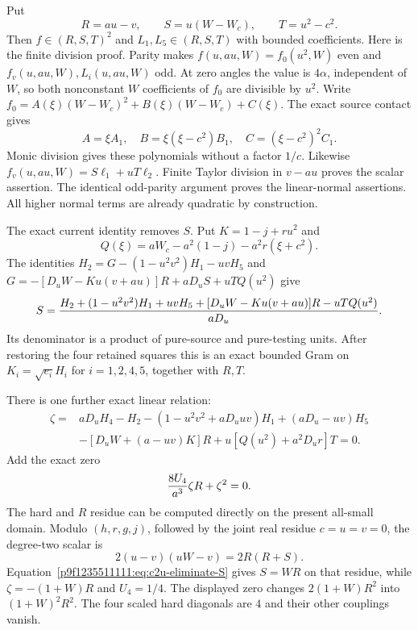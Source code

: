 Put
\[
 R=au-v,\qquad S=u(W-W_c),\qquad T=u^2-c^2.
\]
Then $f\in(R,S,T)^2$ and $L_1,L_5\in(R,S,T)$ with bounded
coefficients. Here is the finite division proof. Parity makes
$f(u,au,W)=f_0(u^2,W)$ even and $f_v(u,au,W),L_i(u,au,W)$ odd.
At zero angles the value is $4\alpha$, independent of $W$, so both
nonconstant $W$ coefficients of $f_0$ are divisible by $u^2$.
Write $f_0=A(\xi)(W-W_c)^2+B(\xi)(W-W_c)+C(\xi)$.
The exact source contact gives
\[
 A=\xi A_1,\quad B=\xi(\xi-c^2)B_1,
 \quad C=(\xi-c^2)^2C_1.
\]
Monic division gives these polynomials without a factor $1/c$.
Likewise $f_v(u,au,W)=S\ell_1+uT\ell_2$. Finite Taylor division in
$v-au$ proves the scalar assertion. The identical odd-parity argument
proves the linear-normal assertions. All higher normal terms are
already quadratic by construction.

The exact current identity removes $S$. Put $K=1-j+ru^2$ and
\[
 Q(\xi)=aW_c-a^2(1-j)-a^2r(\xi+c^2).
\]
The identities $H_2=G-(1-u^2v^2)H_1-uvH_5$ and
$G=-[D_uW-Ku(v+au)]R+aD_uS+uTQ(u^2)$ give
\begin{equation}
 S={H_2+(1-u^2v^2)H_1+uvH_5
       +[D_uW-Ku(v+au)]R-uTQ(u^2)\over aD_u}.
 \label{p9f1235511111:eq:c2u-eliminate-S}
\end{equation}
Its denominator is a product of pure-source and pure-testing units.
After restoring the four retained squares this is an exact bounded
Gram on $K_i=\sqrt{e_i}H_i$ for $i=1,2,4,5$, together with $R,T$.

There is one further exact linear relation:
\begin{equation}
 \begin{split}
 \zeta={}&aD_uH_4-H_2-(1-u^2v^2+aD_uuv)H_1
 +(aD_u-uv)H_5\\
 &-[D_uW+(a-uv)K]R+u[Q(u^2)+a^2D_ur]T=0.
 \end{split}
 \label{p53752031d16c:eq:c2y-zero-relation}
\end{equation}
Add the exact zero
\begin{equation}
 {8U_4\over a^3}\zeta R+\zeta^2=0.
 \label{p53752031d16c:eq:c2y-zero-correction}
\end{equation}
The hard and $R$ residue can be computed directly on the present
all-small domain. Modulo $(h,r,g,j)$, followed by the joint real
residue $c=u=v=0$, the degree-two scalar is
\[
 2(u-v)(uW-v)=2R(R+S).
\]
Equation~\eqref{p9f1235511111:eq:c2u-eliminate-S} gives $S=WR$ on
that residue, while $\zeta=-(1+W)R$ and $U_4=1/4$.
The displayed zero changes $2(1+W)R^2$ into $(1+W)^2R^2$.
The four scaled hard diagonals are $4$ and their other couplings
vanish.

